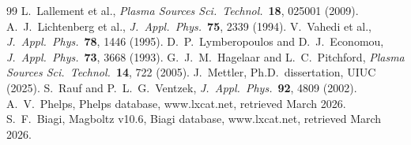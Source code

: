 \documentclass[11pt,a4paper]{article}
\begin{document}
\begin{thebibliography}{99}
 L.~Lallement et al., \textit{Plasma Sources Sci.\ Technol.}\ \textbf{18}, 025001 (2009).
 A.~J.~Lichtenberg et al., \textit{J.~Appl.\ Phys.}\ \textbf{75}, 2339 (1994).
 V.~Vahedi et al., \textit{J.~Appl.\ Phys.}\ \textbf{78}, 1446 (1995).
 D.~P.~Lymberopoulos and D.~J.~Economou, \textit{J.~Appl.\ Phys.}\ \textbf{73}, 3668 (1993).
 G.~J.~M.~Hagelaar and L.~C.~Pitchford, \textit{Plasma Sources Sci.\ Technol.}\ \textbf{14}, 722 (2005).
 J.~Mettler, Ph.D.\ dissertation, UIUC (2025).
 S.~Rauf and P.~L.~G.~Ventzek, \textit{J.~Appl.\ Phys.}\ \textbf{92}, 4809 (2002).
 A.~V.~Phelps, Phelps database, www.lxcat.net, retrieved March 2026.
 S.~F.~Biagi, Magboltz v10.6, Biagi database, www.lxcat.net, retrieved March 2026.
\end{thebibliography}
\end{document}
